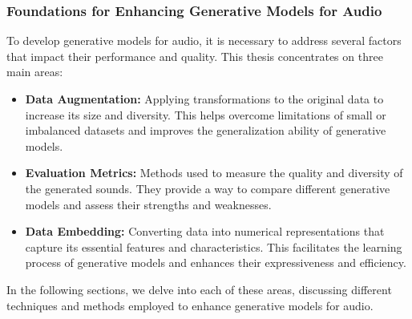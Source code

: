 \begin{frame}
    \frametitle{Foundations for Enhancing Generative Models for Audio}

    To develop generative models for audio, it is necessary to address several factors that impact their performance and quality. This thesis concentrates on three main areas:

    \begin{itemize}
        \item \textbf{Data Augmentation:} Applying transformations to the original data to increase its size and diversity. This helps overcome limitations of small or imbalanced datasets and improves the generalization ability of generative models.
        \item \textbf{Evaluation Metrics:} Methods used to measure the quality and diversity of the generated sounds. They provide a way to compare different generative models and assess their strengths and weaknesses.
        \item \textbf{Data Embedding:} Converting data into numerical representations that capture its essential features and characteristics. This facilitates the learning process of generative models and enhances their expressiveness and efficiency.
    \end{itemize}

    In the following sections, we delve into each of these areas, discussing different techniques and methods employed to enhance generative models for audio.

\end{frame}


